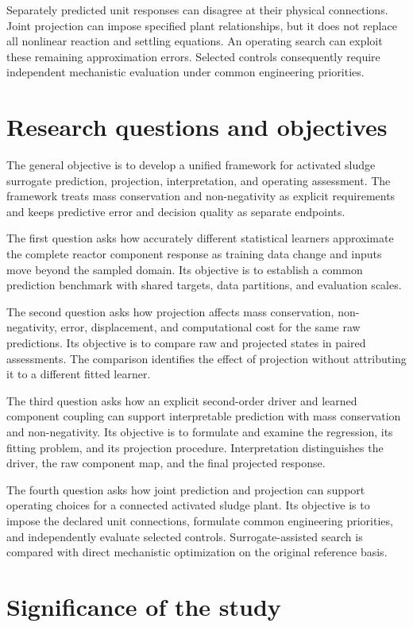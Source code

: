 Separately predicted unit responses can disagree at their physical connections. Joint projection can impose specified plant relationships, but it does not replace all nonlinear reaction and settling equations. An operating search can exploit these remaining approximation errors. Selected controls consequently require independent mechanistic evaluation under common engineering priorities.

\section{Research questions and objectives}

The general objective is to develop a unified framework for activated sludge surrogate prediction, projection, interpretation, and operating assessment. The framework treats mass conservation and non-negativity as explicit requirements and keeps predictive error and decision quality as separate endpoints.

The first question asks how accurately different statistical learners approximate the complete reactor component response as training data change and inputs move beyond the sampled domain. Its objective is to establish a common prediction benchmark with shared targets, data partitions, and evaluation scales.

The second question asks how projection affects mass conservation, non-negativity, error, displacement, and computational cost for the same raw predictions. Its objective is to compare raw and projected states in paired assessments. The comparison identifies the effect of projection without attributing it to a different fitted learner.

The third question asks how an explicit second-order driver and learned component coupling can support interpretable prediction with mass conservation and non-negativity. Its objective is to formulate and examine the regression, its fitting problem, and its projection procedure. Interpretation distinguishes the driver, the raw component map, and the final projected response.

The fourth question asks how joint prediction and projection can support operating choices for a connected activated sludge plant. Its objective is to impose the declared unit connections, formulate common engineering priorities, and independently evaluate selected controls. Surrogate-assisted search is compared with direct mechanistic optimization on the original reference basis.

\section{Significance of the study}

